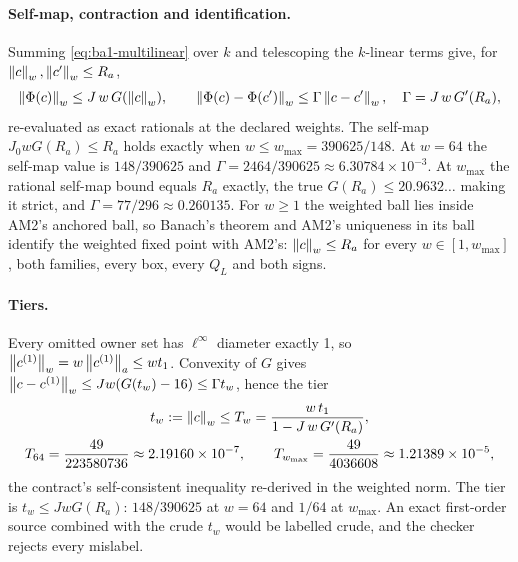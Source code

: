 \paragraph{Self-map, contraction and identification.} Summing
\eqref{eq:ba1-multilinear} over $k$ and telescoping the $k$-linear terms give,
for $\left\lVert c\right\rVert_w,\left\lVert c'\right\rVert_w\le R_a$,
\begin{equation}
 \left\lVert\Phi(c)\right\rVert_w\le J\,w\,G(\left\lVert c\right\rVert_w),\qquad
 \left\lVert\Phi(c)-\Phi(c')\right\rVert_w\le\Gamma\left\lVert c-c'\right\rVert_w,\quad \Gamma=J\,w\,G'(R_a),
 \label{eq:ba1-contraction}
\end{equation}
re-evaluated as exact rationals at the declared weights. The self-map
$J_0wG(R_a)\le R_a$ holds exactly when $w\le w_{\max}=390625/148$. At $w=64$
the self-map value is $148/390625$ and $\Gamma=2464/390625\approx
6.30784\times10^{-3}$. At $w_{\max}$ the rational self-map bound equals $R_a$
exactly, the true $G(R_a)\le20.9632\ldots$ making it strict, and
$\Gamma=77/296\approx0.260135$. For $w\ge1$ the weighted ball lies inside AM2's
anchored ball, so Banach's theorem and AM2's uniqueness in its ball identify
the weighted fixed point with AM2's: $\left\lVert c\right\rVert_w\le R_a$ for every
$w\in[1,w_{\max}]$, both families, every box, every $Q_L$ and both signs.

\paragraph{Tiers.} Every omitted owner set has $\ell^\infty$ diameter exactly
1, so $\left\lVert c^{(1)}\right\rVert_w=w\left\lVert c^{(1)}\right\rVert_a\le wt_1$. Convexity of $G$ gives
$\left\lVert c-c^{(1)}\right\rVert_w\le Jw(G(t_w)-16)\le\Gamma t_w$, hence the
 tier
\begin{equation}
 \begin{gathered}
 t_w:=\left\lVert c\right\rVert_w\le T_w=\frac{w\,t_1}{1-J\,w\,G'(R_a)},\\
 T_{64}=\frac{49}{223580736}\approx2.19160\times10^{-7},\qquad
 T_{w_{\max}}=\frac{49}{4036608}\approx1.21389\times10^{-5},
 \end{gathered}
 \label{eq:ba1-Tw}
\end{equation}
the contract's self-consistent inequality re-derived in the weighted norm. The
 tier is $t_w\le JwG(R_a)$: $148/390625$ at $w=64$ and
$1/64$ at $w_{\max}$. An exact first-order source combined with the crude
$t_w$ would be labelled crude, and the checker rejects every mislabel.


